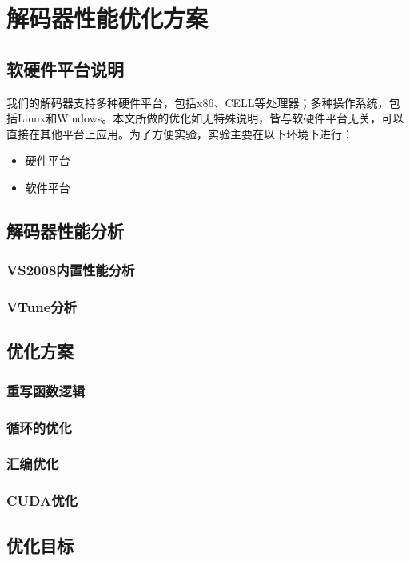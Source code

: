

\chapter{解码器性能优化方案}
\label{cha:optapproach}

\section{软硬件平台说明}
\label{sec:platformdesc}

我们的解码器支持多种硬件平台，包括x86、CELL等处理器；多种操作系统，包括Linux和Windows。本文所做的优化如无特殊说明，皆与软硬件平台无关，可以直接在其他平台上应用。为了方便实验，实验主要在以下环境下进行：

\begin{itemize}
\item {硬件平台}
\item {软件平台}
\end{itemize}


\section{解码器性能分析}
\label{sec:decoderprofiling}

\subsection{VS2008内置性能分析}
\label{subsec:vsprofiling}

\subsection{VTune分析}
\label{subsec:vtuneprofiling}

\section{优化方案}
\label{sec:optapproach}

\subsection{重写函数逻辑}
\label{subsec:rewritelogic}

\subsection{循环的优化}
\label{subsec:loopopt}

\subsection{汇编优化}
\label{subsec:asmopt}

\subsection{CUDA优化}
\label{subsec:cudaopt}

\section{优化目标}
\label{sec:optaim}